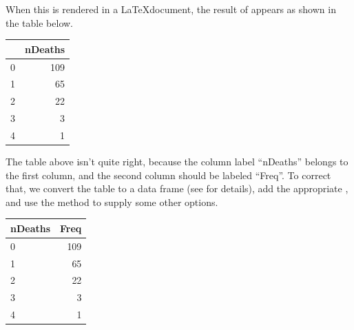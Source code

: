 \documentclass[11pt]{book}
\begin{document}
When this is rendered in a \LaTeX document, the result of 
appears as shown in the table below.
\begin{kframe}
\begin{alltt}
\end{alltt}
\end{kframe}%
\begin{table}[ht]
\centering
\begin{tabular}{rr}
  \hline
 & nDeaths \\ 
  \hline
0 & 109 \\ 
  1 &  65 \\ 
  2 &  22 \\ 
  3 &   3 \\ 
  4 &   1 \\ 
   \hline
\end{tabular}
\end{table}


The table above isn't quite right, because the column label ``nDeaths''
belongs to the first column, and the second column should be labeled ``Freq''.
To correct that, we convert the  table to a data frame
(see  for details), add the appropriate ,
and use the  method to supply some other options.
\begin{kframe}
\begin{alltt}
 \hlkwb{<-} 
 \hlkwb{<-} \hlstd{(}\hlstd{,} \hlstd{)}
\hlstd{(} \hlstd{=}\hlstd{,} \hlstd{=}\hlstd{)}
\end{alltt}
\end{kframe}%
\begin{table}[ht]
\centering
\begin{tabular}{lr}
  \hline
nDeaths & Freq \\ 
  \hline
0 & 109 \\ 
  1 &  65 \\ 
  2 &  22 \\ 
  3 &   3 \\ 
  4 &   1 \\ 
   \hline
\end{tabular}
\end{table}
\end{document}
